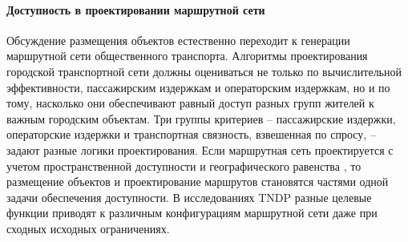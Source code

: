\paragraph*{Доступность в проектировании маршрутной сети}
Обсуждение размещения объектов естественно переходит к генерации маршрутной сети общественного транспорта. Алгоритмы проектирования городской транспортной сети должны оцениваться не только по вычислительной эффективности, пассажирским издержкам и операторским издержкам, но и по тому, насколько они обеспечивают равный доступ разных групп жителей к важным городским объектам. Три группы критериев -- пассажирские издержки, операторские издержки и транспортная связность, взвешенная по спросу, -- задают разные логики проектирования. Если маршрутная сеть проектируется с учетом пространственной доступности и географического равенства \cite{wang2024spatialEquityTndp}, то размещение объектов и проектирование маршрутов становятся частями одной задачи обеспечения доступности. В исследованиях TNDP разные целевые функции приводят к различным конфигурациям маршрутной сети даже при сходных исходных ограничениях.
